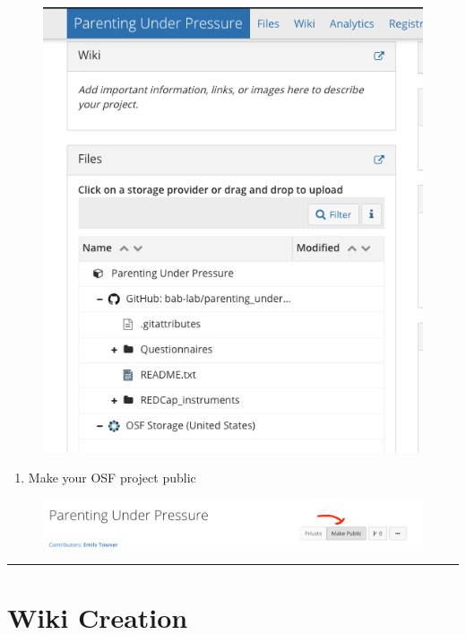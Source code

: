 \documentclass[]{book}
\providecommand{\tightlist}{%
  \setlength{\itemsep}{0pt}\setlength{\parskip}{0pt}}
\begin{document}
\begin{figure}
\centering
\includegraphics{images/research_protocols/osf/9.png}
\caption{}
\end{figure}

\begin{enumerate}
\def\labelenumi{\arabic{enumi}.}
\setcounter{enumi}{7}
\tightlist
\item
  Make your OSF project public
\end{enumerate}

\begin{figure}
\centering
\includegraphics{images/research_protocols/osf/10.png}
\caption{}
\end{figure}

\begin{center}\rule{0.5\linewidth}{0.5pt}\end{center}

\hypertarget{wiki-creation}{%
\section{Wiki Creation}\label{wiki-creation}}
\end{document}
